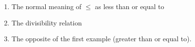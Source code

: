 \begin{enumerate}
    \item The normal meaning of $\leq$ as less than or equal to
    \item The divisibility relation
    \item The opposite of the first example (greater than or equal to).
  \end{enumerate}

